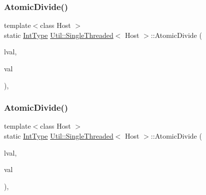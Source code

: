 \mbox{\label{classUtil_1_1SingleThreaded_ab6c6cc9b62833f2a6e9f52aac7243a74}} 
\subsubsection{\texorpdfstring{AtomicDivide()}{AtomicDivide()}\hspace{0.1cm}{\footnotesize\ttfamily [2/6]}}
{\footnotesize\ttfamily template$<$class Host $>$ \\
static \mbox{\hyperlink{classUtil_1_1SingleThreaded_a35932213fb0c15a7b67ced79bc2af4c6}{Int\+Type}} \mbox{\hyperlink{classUtil_1_1SingleThreaded}{Util\+::\+Single\+Threaded}}$<$ Host $>$\+::Atomic\+Divide (\begin{DoxyParamCaption}\item[{volatile \mbox{\hyperlink{classUtil_1_1SingleThreaded_a35932213fb0c15a7b67ced79bc2af4c6}{Int\+Type}} \&}]{lval,  }\item[{\mbox{\hyperlink{classUtil_1_1SingleThreaded_a35932213fb0c15a7b67ced79bc2af4c6}{Int\+Type}}}]{val }\end{DoxyParamCaption})\hspace{0.3cm}{\ttfamily [inline]}, {\ttfamily [static]}}

\mbox{\label{classUtil_1_1SingleThreaded_ab6c6cc9b62833f2a6e9f52aac7243a74}} 
\subsubsection{\texorpdfstring{AtomicDivide()}{AtomicDivide()}\hspace{0.1cm}{\footnotesize\ttfamily [3/6]}}
{\footnotesize\ttfamily template$<$class Host $>$ \\
static \mbox{\hyperlink{classUtil_1_1SingleThreaded_a35932213fb0c15a7b67ced79bc2af4c6}{Int\+Type}} \mbox{\hyperlink{classUtil_1_1SingleThreaded}{Util\+::\+Single\+Threaded}}$<$ Host $>$\+::Atomic\+Divide (\begin{DoxyParamCaption}\item[{volatile \mbox{\hyperlink{classUtil_1_1SingleThreaded_a35932213fb0c15a7b67ced79bc2af4c6}{Int\+Type}} \&}]{lval,  }\item[{\mbox{\hyperlink{classUtil_1_1SingleThreaded_a35932213fb0c15a7b67ced79bc2af4c6}{Int\+Type}}}]{val }\end{DoxyParamCaption})\hspace{0.3cm}{\ttfamily [inline]}, {\ttfamily [static]}}

